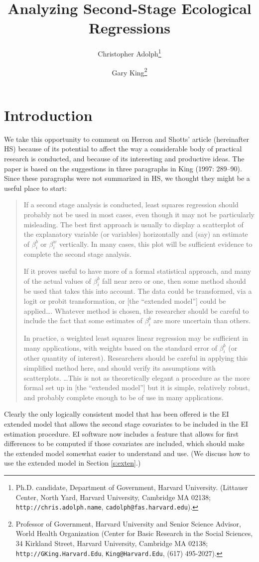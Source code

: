 \documentclass[11pt,titlepage]{article}
\title{Analyzing Second-Stage Ecological Regressions}
\author{Christopher Adolph\thanks{Ph.D. candidate, Department of
    Government, Harvard University. (Littauer Center, North Yard,
    Harvard University, Cambridge MA 02138;
    \texttt{http://chris.adolph.name},
    \texttt{cadolph@fas.harvard.edu}).}
\and %
Gary King\thanks{Professor of Government, Harvard University and
  Senior Science Advisor, World Health Organization (Center for Basic
  Research in the Social Sciences, 34 Kirkland Street, Harvard
  University, Cambridge MA 02138; \texttt{http://GKing.Harvard.Edu},
  \texttt{King@Harvard.Edu}, (617) 495-2027).}  }
\begin{document}
\maketitle

\section{Introduction}

We take this opportunity to comment on Herron and Shotts' article
(hereinafter HS) because of its potential to affect the way a
considerable body of practical research is conducted, and because of
its interesting and productive ideas.  The paper is based on the
suggestions in three paragraphs in King (1997: 289--90).  Since these
paragraphs were not summarized in HS, we thought they might be a
useful place to start:
\begin{quotation}
  If a second stage analysis is conducted, least squares regression
  should probably not be used in most cases, even though it may not be
  particularly misleading.  The best first approach is usually to
  display a scatterplot of the explanatory variable (or variables)
  horizontally and (say) an estimate of $\beta_i^b$ or $\beta_i^w$
  vertically.  In many cases, this plot will be sufficient evidence to
  complete the second stage analysis.
  
  If it proves useful to have more of a formal statistical approach,
  and many of the actual values of $\beta_i^b$ fall near zero or one,
  then some method should be used that takes this into account.  The
  data could be transformed, via a logit or probit transformation, or
  [the ``extended model''] could be applied\ldots.  Whatever method is
  chosen, the researcher should be careful to include the fact that
  some estimates of $\beta_i^b$ are more uncertain than others.
    
  In practice, a weighted least squares linear regression may be
  sufficient in many applications, with weights based on the standard
  error of $\beta_i^b$ (or other quantity of interest).  Researchers
  should be careful in applying this simplified method here, and
  should verify its assumptions with scatterplots. \ldots This is not
  as theoretically elegant a procedure as the more formal set up in
  [the ``extended model''] but it is simple, relatively robust, and
  probably complete enough to be of use in many applications.
\end{quotation}  

Clearly the only logically consistent model that has been offered is
the EI extended model that allows the second stage covariates to be
included in the EI estimation procedure.  EI software now includes a
feature that allows for first differences to be computed if those
covariates are included, which should make the extended model somewhat
easier to understand and use.  (We discuss how to use the extended
model in Section \ref{s:exten}.)
\end{document}
